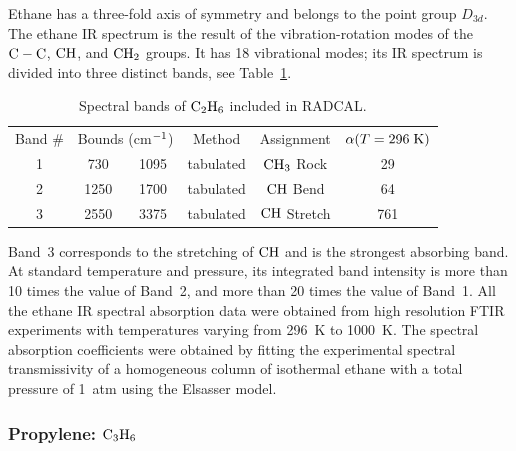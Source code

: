 Ethane has a three-fold axis of symmetry and belongs to the point group $D_{3d}$. The ethane IR spectrum is the result of the vibration-rotation modes of the $\rm C-C$, $\rm CH$, and $\rm CH_2$ groups. It has 18 vibrational modes; its IR spectrum is divided into three distinct bands, see Table~\ref{Table::C2H6}.
\begin{table} [ht]
    \centering
    \caption{Spectral bands of $\rm C_2H_6$ included in RADCAL.}
    \vspace{0.1in}
    \label{Table::C2H6}
    \begin{tabular}{|c|c|c|c|c|c|}
      \hline
      Band \# & \multicolumn{2}{|l|}{Bounds (cm$\rm ^{-1}$) } & Method & Assignment & $\alpha(T=296 \; {\rm K})$\\
      \cline{1-6}
      1 & 730  & 1095 & tabulated &  $\rm CH_3$ Rock   &  29  \\
      2 & 1250 & 1700 & tabulated &  $\rm CH$  Bend    &  64  \\
      3 & 2550 & 3375 & tabulated &  $\rm CH$  Stretch &  761 \\
      \hline
    \end{tabular}
\end{table}
Band~3 corresponds to the stretching of $\rm CH$ and is the strongest absorbing band. At standard temperature and pressure, its integrated band intensity is more than 10 times the value of
Band~2, and more than 20 times the value of Band~1. All the ethane IR spectral absorption data were obtained from high resolution FTIR experiments with temperatures varying from 296~K to 1000~K. The spectral absorption coefficients were obtained by fitting the experimental spectral transmissivity of a homogeneous column of isothermal ethane with a total pressure of 1~atm using the Elsasser model.

\subsubsection{Propylene: $\rm C_3H_6$}

